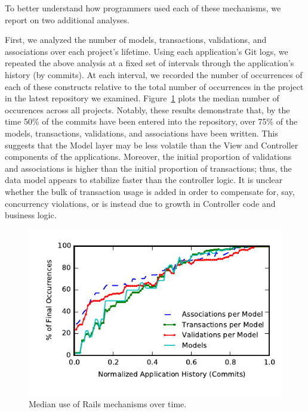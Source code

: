  To better understand how programmers
used each of these mechanisms, we report on two additional
analyses.

First, we analyzed the number of models, transactions, validations,
and associations over each project's lifetime. Using each
application's Git logs, we repeated the above analysis at a fixed set
of intervals through the application's history (by commits). At each
interval, we recorded the number of occurrences of each of these
constructs relative to the total number of occurrences in the project
in the latest repository we examined. Figure~\ref{fig:historical}
plots the median number of occurences across all projects. Notably,
these results demonstrate that, by the time 50\% of the commits have
been entered into the repository, over 75\% of the models,
transactions, validations, and associations have been written. This
suggests that the Model layer may be less volatile than the View and
Controller components of the applications. Moreover, the initial
proportion of validations and associations is higher than the initial
proportion of transactions; thus, the data model appears to stabilize
faster than the controller logic. It is unclear whether the bulk of
transaction usage is added in order to compensate for, say,
concurrency violations, or is instead due to growth in Controller code
and business logic.

\begin{figure}
\includegraphics[width=\columnwidth]{figs/historical-median.pdf}\vspace{-2em}
\caption{Median use of Rails mechanisms over time.}
\label{fig:historical}
\end{figure}

